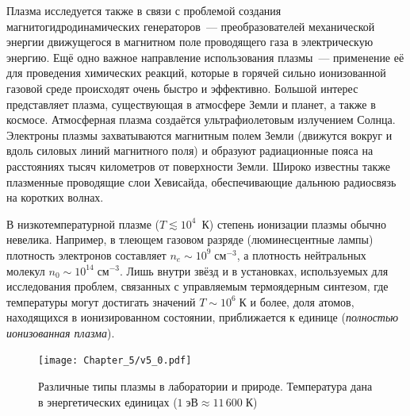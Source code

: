 Плазма исследуется также в связи с проблемой создания магнитогидродинамических
генераторов~--- преобразователей
механической энергии движущегося в магнитном поле проводящего газа в
электрическую энергию. Ещё одно важное направление использования плазмы~---
применение её для проведения химических реакций, которые в горячей
сильно ионизованной газовой среде происходят очень быстро и эффективно.
Большой интерес представляет плазма, существующая в атмосфере Земли и планет, а
также в космосе. Атмосферная плазма создаётся ультрафиолетовым излучением
Солнца. Электроны плазмы захватываются магнитным полем Земли (движутся вокруг и
вдоль силовых линий магнитного поля) и образуют радиационные пояса на
расстояниях тысяч километров от поверхности Земли. Широко известны также
плазменные проводящие слои Хевисайда, обеспечивающие дальнюю радиосвязь
на коротких волнах.

В низкотемпературной плазме ($T\lesssim 10^4$~К) степень ионизации плазмы
обычно невелика. Например, в тлеющем газовом разряде (люминесцентные лампы)
плотность электронов составляет $n_e\sim 10^9\;\text{см}^{-3}$,
а плотность нейтральных молекул $n_0\sim 10^{14}\;\text{см}^{-3}$.
Лишь внутри звёзд и в установках, используемых для исследования проблем,
связанных с управляемым термоядерным синтезом,
где температуры могут достигать значений $T \sim 10^{6}\;К$ и более,
доля атомов, находящихся в ионизированном состоянии, приближается
к единице (\emph{полностью ионизованная плазма}).

\begin{figure}[ht]
    \centering
    \texttt{[image: Chapter\_5/v5\_0.pdf]}
    \caption{Различные типы плазмы в лаборатории и природе. Температура
    дана в энергетических единицах ($1\;эВ\approx 11\,600\;К$)}
\end{figure}

